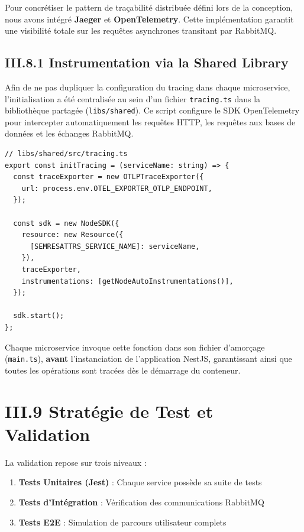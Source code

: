 Pour concrétiser le pattern de traçabilité distribuée défini lors de la conception, nous avons intégré \textbf{Jaeger} et \textbf{OpenTelemetry}. Cette implémentation garantit une visibilité totale sur les requêtes asynchrones transitant par RabbitMQ.

\subsection{III.8.1 Instrumentation via la Shared Library}
Afin de ne pas dupliquer la configuration du tracing dans chaque microservice, l'initialisation a été centralisée au sein d'un fichier \texttt{tracing.ts} dans la bibliothèque partagée (\texttt{libs/shared}). Ce script configure le SDK OpenTelemetry pour intercepter automatiquement les requêtes HTTP, les requêtes aux bases de données et les échanges RabbitMQ.

\begin{verbatim}
// libs/shared/src/tracing.ts
export const initTracing = (serviceName: string) => {
  const traceExporter = new OTLPTraceExporter({
    url: process.env.OTEL_EXPORTER_OTLP_ENDPOINT,
  });

  const sdk = new NodeSDK({
    resource: new Resource({
      [SEMRESATTRS_SERVICE_NAME]: serviceName,
    }),
    traceExporter,
    instrumentations: [getNodeAutoInstrumentations()],
  });

  sdk.start();
};
\end{verbatim}

Chaque microservice invoque cette fonction dans son fichier d'amorçage (\texttt{main.ts}), \textbf{avant} l'instanciation de l'application NestJS, garantissant ainsi que toutes les opérations sont tracées dès le démarrage du conteneur.

\section{III.9 Stratégie de Test et Validation}
\label{sec:testing}

La validation repose sur trois niveaux :
\begin{enumerate}
    \item \textbf{Tests Unitaires (Jest)} : Chaque service possède sa suite de tests
    \item \textbf{Tests d'Intégration} : Vérification des communications RabbitMQ
    \item \textbf{Tests E2E} : Simulation de parcours utilisateur complets
\end{enumerate}

